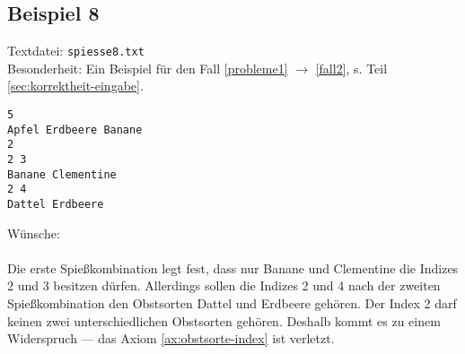 \subsection{Beispiel 8}\label{example:8}
Textdatei: \texttt{spiesse8.txt}\\
Besonderheit: Ein Beispiel für den Fall \ref{probleme1} $\rightarrow$ \ref{fall2}, s. Teil \ref{sec:korrektheit-eingabe}.
\begin{verbatim}
5
Apfel Erdbeere Banane
2
2 3
Banane Clementine
2 4
Dattel Erdbeere
\end{verbatim}

\noindent
Wünsche: \\

\noindent
{}\\

Die erste Spießkombination legt fest, dass nur Banane und Clementine die Indizes 2 und 3 besitzen dürfen.
Allerdings sollen die Indizes 2 und 4 nach der zweiten Spießkombination den Obstsorten Dattel und Erdbeere 
gehören. Der Index 2 darf keinen zwei unterschiedlichen Obstsorten gehören.
Deshalb kommt es zu einem Widerspruch --- das Axiom \ref{ax:obstsorte-index} ist verletzt.